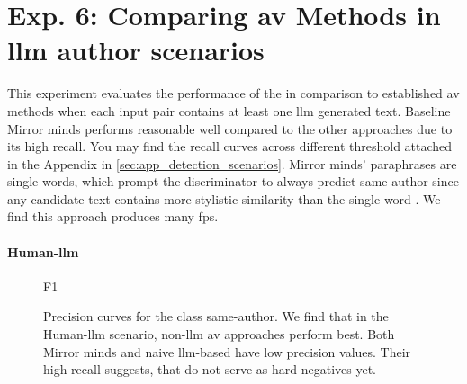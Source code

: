 \section{Exp. 6: Comparing \ac{av} Methods in \acs{llm} author scenarios}

This experiment evaluates the performance of the \impAppr{} in comparison to established \ac{av} methods when each input pair contains at least one \ac{llm} generated text.
Baseline Mirror minds performs reasonable well compared to the other approaches due to its high recall.
You may find the recall curves across different threshold attached in the Appendix in \autoref{sec:app_detection_scenarios}.
Mirror minds' paraphrases are single words, which prompt the discriminator to always predict same-author since any candidate text contains more stylistic similarity than the single-word \imps{}.
We find this approach produces many \acp{fp}.


\paragraph{Human-\ac{llm}}

  \begin{figure}[b]
    \centering
    
    \caption{F1}
    \label{fig:human-lllm_f1}
  \end{figure}

  \begin{figure}[b]
    
  \caption{Precision curves for the class same-author. 
  We find that in the Human-\ac{llm} scenario, non-\ac{llm} \ac{av} approaches perform best. 
  Both Mirror minds and naive \ac{llm}-based have low precision values.
  Their high recall suggests, that \imps{} do not serve as hard negatives yet.}
  \label{fig:detec_scen_human-llm}
\end{figure}